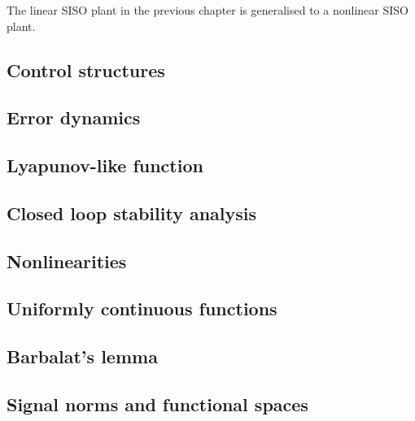 The linear SISO plant in the previous chapter is generalised to
a nonlinear SISO plant.\\



\subsection{Control structures}


\subsection{Error dynamics}


\subsection{Lyapunov-like function}


\subsection{Closed loop stability analysis}


\subsection{Nonlinearities}


\subsection{Uniformly continuous functions}
\label{ch:uniform-continuous}


\subsection{Barbalat's lemma}
\label{ch:barbalat}


\subsection{Signal norms and functional spaces}


